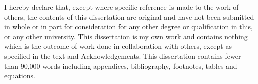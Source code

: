 
\begin{declaration}

I hereby declare that, except where specific reference is made to the work of others, the contents of this dissertation are original and have not been submitted in whole or in part for consideration for any other degree or qualification in this, or any other university. This dissertation is my own 
work and contains nothing which is the outcome of work done in collaboration with others, except as specified in the text and Acknowledgements. This dissertation contains fewer than 90,000 words including appendices, bibliography, footnotes, tables and equations.


\end{declaration}

